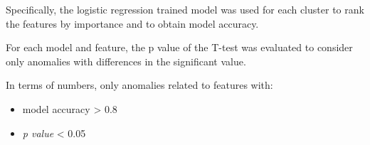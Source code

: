 Specifically, the logistic regression trained model was used for each cluster to rank the features by importance and to obtain model accuracy.

For each model and feature, the p value of the T-test was evaluated to consider only anomalies with differences in the significant value.

In terms of numbers, only anomalies related to features with:
\begin{itemize}
\item model accuracy > 0.8
\item \textit{p value} < 0.05
\end{itemize}
